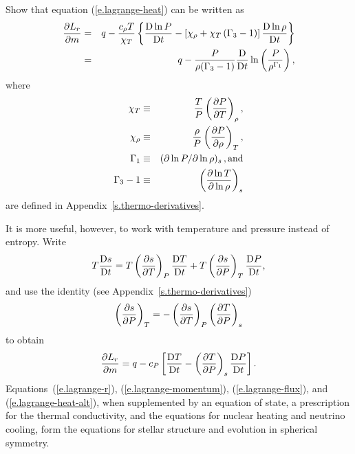 \begin{exercisebox}
 \label{p.lagrange-heat} Show that equation (\ref{e.lagrange-heat}) can be written as
\begin{eqnarray}
\frac{\partial L_{r}}{\partial m} &=& q - \frac{c_{\rho} T}{\chi_{T}}\left\{\frac{\mathrm{D}\ln P}{\mathrm{D} t} - \left[\chi_{\rho} + \chi_{T}\left(\Gamma_{3} - 1\right)\right]\frac{\mathrm{D}\ln \rho}{\mathrm{D} t}\right\}\\
 &=& q - \frac{P}{\rho(\Gamma_{3}-1)}\frac{\mathrm{D} }{\mathrm{D} t}\ln\left(\frac{P}{\rho^{\Gamma_{1}}}\right),
\label{e.lagrange-heat-alt2}
\end{eqnarray}
where
\begin{eqnarray*}
 \chi_{T} &\equiv& \frac{T}{P}\left(\frac{\partial P}{\partial T}\right)_{\rho},\\
 \chi_{\rho} &\equiv& \frac{\rho}{P}\left(\frac{\partial P}{\partial \rho}\right)_{T},\\
 \Gamma_{1} &\equiv& (\partial \ln P/\partial\ln \rho)_{s}\,,\textrm{and}\\
 \Gamma_{3}-1 &\equiv& \left(\frac{\partial \ln T}{\partial \ln \rho}\right)_{s}
\end{eqnarray*}
are defined in Appendix~\ref{s.thermo-derivatives}. 
\end{exercisebox}


It is more useful, however, to work with temperature and pressure instead of entropy.  Write
\[
	T\frac{\mathrm{D} s}{\mathrm{D} t} = T\left(\frac{\partial s}{\partial T}\right)_{P}\frac{\mathrm{D} T}{\mathrm{D} t} + T\left(\frac{\partial s}{\partial P}\right)_{T}\frac{\mathrm{D} P}{\mathrm{D} t},
\]
and use the identity (see Appendix~\ref{s.thermo-derivatives})
\[
	\left(\frac{\partial s}{\partial P}\right)_{T} = -\left(\frac{\partial s}{\partial T}\right)_{P}\left(\frac{\partial T}{\partial P}\right)_{s}
\]
to obtain
\begin{equation}\label{e.lagrange-heat-alt}
	\frac{\partial L_{r}}{\partial m} 
	= q - c_{P}\left[ \frac{\mathrm{D} T}{\mathrm{D} t} - \left(\frac{\partial T}{\partial P}\right)_{s} \frac{\mathrm{D} P}{\mathrm{D} t}\right].
\end{equation}
Equations~(\ref{e.lagrange-r}), (\ref{e.lagrange-momentum}), (\ref{e.lagrange-flux}), and (\ref{e.lagrange-heat-alt}), when supplemented by an equation of state, a prescription for the thermal conductivity, and the equations for nuclear heating and neutrino cooling, form the equations for stellar structure and evolution in spherical symmetry. 
